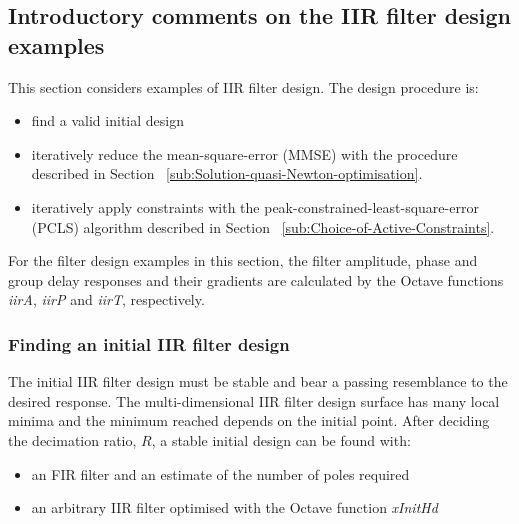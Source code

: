 \documentclass[a4paper,twoside,10pt,english]{report}
\begin{document}
\subsection{Introductory comments on the IIR filter design examples}
This section considers examples of IIR filter design. The design procedure is:
\begin{itemize} 
\item find a valid initial design
\item iteratively reduce the mean-square-error (MMSE) with the procedure
described in Section ~\ref{sub:Solution-quasi-Newton-optimisation}. 
\item iteratively apply constraints with the peak-constrained-least-square-error
(PCLS) algorithm described in Section ~\ref{sub:Choice-of-Active-Constraints}.
\end{itemize}
For the filter design examples in this section, the filter amplitude, phase and
group delay responses and their gradients are calculated by the Octave 
functions \emph{iirA}, \emph{iirP} and \emph{iirT}, respectively.
\subsubsection{Finding an initial IIR filter design}
The initial IIR filter design must be stable and bear a passing resemblance
to the desired response. The multi-dimensional IIR filter design 
surface has many local minima and the minimum reached depends on the initial
point. After deciding the decimation ratio, $R$, a stable initial design can 
be found with:
\begin{itemize}
\item an FIR filter and an estimate of the number of poles required
\item an arbitrary IIR filter optimised with the Octave function \emph{xInitHd}
\end{itemize}
\end{document}
